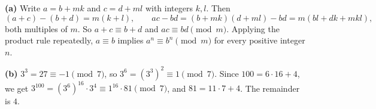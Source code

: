 \textbf{(a)} Write $a=b+mk$ and $c=d+ml$ with integers $k,l$. Then
\[
(a+c)-(b+d)=m(k+l),\qquad ac-bd=(b+mk)(d+ml)-bd=m(bl+dk+mkl),
\]
both multiples of $m$. So $a+c\equiv b+d$ and $ac\equiv bd\pmod m$. Applying the product rule repeatedly, $a\equiv b$ implies $a^n\equiv b^n\pmod m$ for every positive integer $n$.

\textbf{(b)} $3^3=27\equiv-1\pmod7$, so $3^6=(3^3)^2\equiv1\pmod7$. Since $100=6\cdot16+4$, we get $3^{100}=(3^6)^{16}\cdot3^4\equiv1^{16}\cdot81\pmod7$, and $81=11\cdot7+4$. The remainder is $\boxed{4}$.
